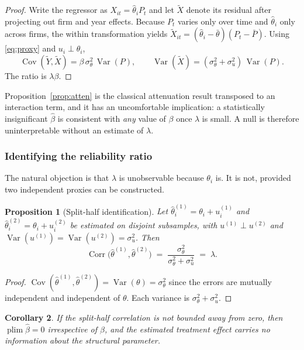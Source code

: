\documentclass[review,12pt,authoryear]{elsarticle}
\theoremstyle{plain}
\newtheorem{proposition}{Proposition}
\newtheorem{corollary}[proposition]{Corollary}
\theoremstyle{definition}
\newcommand{\Var}{\operatorname{Var}}
\newcommand{\Cov}{\operatorname{Cov}}
\newcommand{\Corr}{\operatorname{Corr}}
\newcommand{\plim}{\operatorname*{plim}}
\begin{document}
\begin{proof}
Write the regressor as $X_{it}=\widehat{\theta}_iP_t$ and let $\tilde{X}$ denote
its residual after projecting out firm and year effects. Because $P_t$ varies
only over time and $\widehat{\theta}_i$ only across firms, the within
transformation yields
$\tilde{X}_{it}=(\widehat{\theta}_i-\bar{\theta})(P_t-\bar{P})$. Using
\eqref{eq:proxy} and $u_i\perp\theta_i$,
\[
\Cov(\tilde{Y},\tilde{X})=\beta\,\sigma_\theta^2\,\Var(P),
\qquad
\Var(\tilde{X})=(\sigma_\theta^2+\sigma_u^2)\,\Var(P).
\]
The ratio is $\lambda\beta$. \end{proof}

Proposition~\ref{prop:atten} is the classical attenuation result
\citep{pagan1984} transposed to an interaction term, and it has an
uncomfortable implication: a statistically insignificant $\widehat{\beta}$ is
consistent with \emph{any} value of $\beta$ once $\lambda$ is small. A null is
therefore uninterpretable without an estimate of $\lambda$.

\subsubsection{Identifying the reliability ratio}

The natural objection is that $\lambda$ is unobservable because $\theta_i$ is.
It is not, provided two independent proxies can be constructed.

\begin{proposition}[Split-half identification]
\label{prop:split}
Let $\widehat{\theta}^{(1)}_i=\theta_i+u^{(1)}_i$ and
$\widehat{\theta}^{(2)}_i=\theta_i+u^{(2)}_i$ be estimated on disjoint
subsamples, with $u^{(1)}\perp u^{(2)}$ and
$\Var(u^{(1)})=\Var(u^{(2)})=\sigma^2_u$. Then
\begin{equation}
\Corr\bigl(\widehat{\theta}^{(1)},\widehat{\theta}^{(2)}\bigr)
\;=\;\frac{\sigma_\theta^2}{\sigma_\theta^2+\sigma_u^2}\;=\;\lambda .
\end{equation}
\end{proposition}

\begin{proof}
$\Cov(\widehat{\theta}^{(1)},\widehat{\theta}^{(2)})
=\Var(\theta)=\sigma_\theta^2$ since the errors are mutually independent and
independent of $\theta$. Each variance is $\sigma_\theta^2+\sigma_u^2$.
\end{proof}

\begin{corollary}
\label{cor:uninformative}
If the split-half correlation is not bounded away from zero, then
$\plim\widehat{\beta}=0$ irrespective of $\beta$, and the estimated treatment
effect carries no information about the structural parameter.
\end{corollary}
\end{document}
